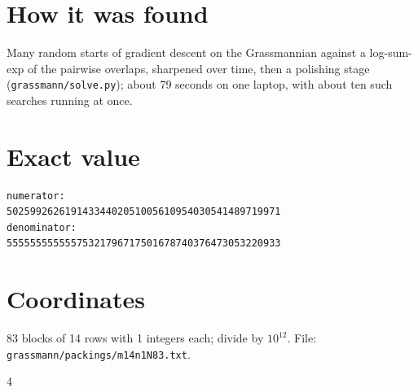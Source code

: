 \documentclass[11pt,a4paper]{article}
\begin{document}
\section{How it was found}
Many random starts of gradient descent on the Grassmannian against a log-sum-exp of the pairwise overlaps, sharpened over time, then a polishing stage (\texttt{grassmann/solve.py}); about 79 seconds on one laptop, with about ten such searches running at once.


\appendix
\section{Exact value}
{\small
\begin{verbatim}
numerator:
50259926261914334402051005610954030541489719971
denominator:
55555555555575321796717501678740376473053220933
\end{verbatim}}

\section{Coordinates}
83 blocks of 14 rows with 1 integers each; divide by $10^{12}$. File: \texttt{grassmann/packings/m14n1N83.txt}.
{\tiny
\begin{multicols}{4}
\end{multicols}}
\end{document}
